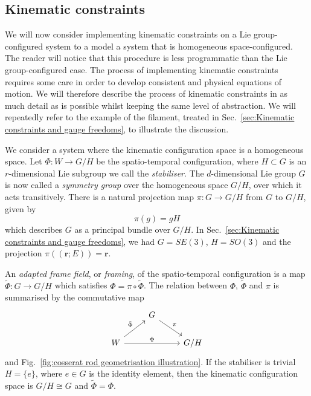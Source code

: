 \subsection{Kinematic constraints} \label{sec:Adapted frames and gauge choices}

We will now consider implementing kinematic constraints on a Lie group-configured system to a model a system that is homogeneous space-configured. The reader will notice that this procedure is less programmatic than the Lie group-configured case. The process of implementing kinematic constraints requires some care in order to develop consistent and physical equations of motion. We will therefore describe the process of kinematic constraints in as much detail as is possible whilst keeping the same level of abstraction. We will repeatedly refer to the example of the filament, treated in Sec.~\ref{sec:Kinematic constraints and gauge freedoms}, to illustrate the discussion.

We consider a system where the kinematic configuration space is a homogeneous space. Let $\Phi : W \to G/H$ be the spatio-temporal configuration, where $H \subset G$ is an $r$-dimensional Lie subgroup we call the \textit{stabiliser}. The $d$-dimensional Lie group $G$ is now called a \textit{symmetry group} over the homogeneous space $G/H$, over which it acts transitively. There is a natural projection map $\pi : G \to G/H$ from $G$ to $G/H$, given by
\begin{equation}
\pi(g) = gH
\end{equation}
which describes $G$ as a principal bundle over $G/H$. In Sec.~\ref{sec:Kinematic constraints and gauge freedoms}, we had $G=SE(3)$, $H=SO(3)$ and the projection $\pi((\mathbf{r}; E)) = \mathbf{r}$. 

An \textit{adapted frame field}, or \textit{framing}, of the spatio-temporal configuration is a map $\tilde{\Phi} : G \to G/H$ which satisfies $\Phi = \pi \circ \tilde{\Phi}$. The relation between $\Phi$, $\tilde{\Phi}$ and $\pi$ is summarised by the commutative map
\[
\begin{tikzcd}[column sep=2.5em]
 & G \arrow{dr}{\pi} \\
W \arrow{ur}{\tilde{\Phi}} \arrow{rr}{\Phi} && G/H
\end{tikzcd}
\]
and Fig.~\ref{fig:cosserat rod geometrisation illustration}. If the stabiliser is trivial $H = \{ e \}$, where $e \in G$ is the identity element, then the kinematic configuration space is $G / H \cong G$ and $\tilde{\Phi} = \Phi$.

